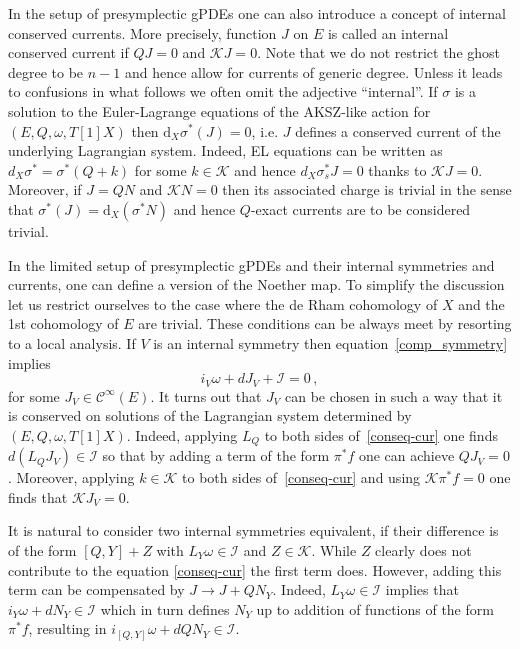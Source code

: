 \documentclass[a4paper,12pt]{article}
\numberwithin{equation}{section} %
\newcommand{\dx}{\mathrm{d}_X}
\newcommand{\cC}{\mathcal{C}}
\def\cI{\mathcal{I}}
\def\cK{\mathcal{K}}
\begin{document}
In the setup of presymplectic gPDEs one can also introduce a concept of internal conserved currents. More precisely, function $J$ on $E$ is called an internal conserved current if $QJ=0$ and $\cK J=0$. Note that we do not restrict the ghost degree to be $n-1$ and hence allow for currents of generic degree. Unless it leads to confusions in what follows we often omit the adjective ``internal''. If $\sigma$ is a solution to the Euler-Lagrange equations of the AKSZ-like action for $(E,Q,\omega,T[1]X)$ then $\dx\sigma^*(J)=0$, i.e. $J$ defines a conserved current of the underlying Lagrangian system. Indeed, EL equations can be written as $d_X\sigma^* = \sigma^*(Q+k)$ for some $k\in \cK$ and hence $d_X\sigma_s^*J = 0$ thanks to $\cK J=0$. Moreover, if $J=QN$ and $\cK N=0$ then its associated charge is trivial in the sense that $\sigma^*(J)=\dx(\sigma^*N)$ and hence $Q$-exact currents are to be considered trivial.

In the limited setup of presymplectic gPDEs and their internal symmetries and currents, one can define a version of the Noether map. To simplify the discussion let us restrict ourselves to the case where the de Rham cohomology of $X$ and the 1st cohomology of $E$ are trivial. These conditions can be always meet by resorting to a local analysis. If $V$ is an internal symmetry then equation~\eqref{comp_symmetry} implies 
\begin{equation} \label{conseq-cur}
    i_V\omega + dJ_V + \cI = 0\,,
\end{equation}
for some $J_V \in \cC^\infty(E)$. It turns out that $J_V$ can be chosen in such a way that it is conserved on solutions of the Lagrangian system determined by $(E,Q,\omega,T[1]X)$. Indeed, applying $L_Q$ to both sides of~\eqref{conseq-cur} one finds $d(L_QJ_V)\in\cI$ so that by adding a term of the form $\pi^*f$ one can achieve $QJ_V=0$. Moreover, applying $k\in\cK$ to both sides of~\eqref{conseq-cur} and using $\cK\pi^*f=0$ one finds that
$\cK J_V=0$.



It is natural to consider two internal symmetries equivalent, if their difference is of the form $[Q,Y]+Z$ with $L_Y\omega \in \cI$ and $Z\in \cK$. While $Z$ clearly does not contribute to the equation \eqref{conseq-cur} the first term does. However, adding this term can be compensated by  $J \xrightarrow{} J + QN_Y$. Indeed, $L_Y\omega \in \cI$ implies that $i_Y\omega + dN_Y \in \cI$ which in turn defines $N_Y$ up to addition of functions of the form $\pi^*f$, resulting in $i_{[Q,Y]}\omega +dQN_Y\in \cI$. 
\end{document}
